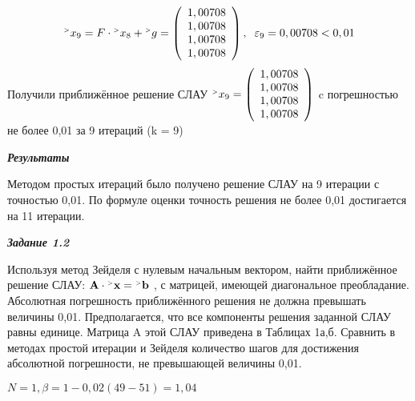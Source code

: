 \documentclass[12pt]{article}
\begin{document}
\begin{equation*}
	{}^{\mathsmaller{>}} x_{9}= F \cdot 
	{}^{\mathsmaller{>}} x_{8} +  {}^{\mathsmaller{>}} g = 
	\left(
	\begin{array}{c}
		1,00708 \\ 1,00708 \\ 1,00708 \\ 1,00708 \\ 
	\end{array}
	\right), \hspace{0.2cm}
	\varepsilon_9 = 0,00708 < 0,01
\end{equation*}
Получили приближённое решение СЛАУ $
	{}^{\mathsmaller{>}} x_{9}= 
	\left(
	\begin{array}{c}
		1,00708 \\ 1,00708 \\ 1,00708 \\ 1,00708 \\ 
	\end{array}
	\right)$
c погрешностью не более 0,01 за 9 итераций (k = 9)
\begin{center}
	\textbf{\textit{Результаты}}
\end{center}
Методом простых итераций было получено решение СЛАУ на 9 итерации с точностью 0,01.
По формуле оценки точность решения не более 0,01 достигается на 11 итерации.
 
\begin{center}
	\textbf{\textit{Задание 1.2}}
\end{center}

Используя метод Зейделя с нулевым начальным вектором, найти приближённое решение
СЛАУ: $	\mathbf{A \cdot {}^{\mathsmaller{>}} x = {}^\mathsmaller{>}b}$
, с матрицей, имеющей диагональное преобладание. Абсолютная
погрешность приближённого решения не должна превышать величины 0,01.
Предполагается, что все компоненты решения заданной СЛАУ равны единице. Матрица
A
этой СЛАУ приведена в Таблицах 1а,б. Сравнить в методах простой итерации и
Зейделя количество шагов для достижения абсолютной погрешности, не превышающей
величины 0,01.

$N = 1, \beta = 1-0,02(49-51) = 1,04$
\end{document}
